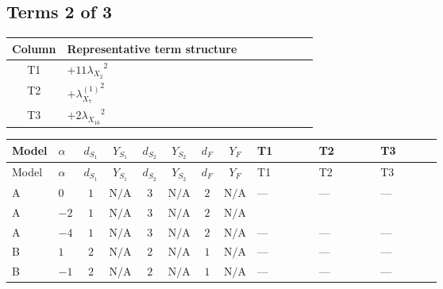 \documentclass[8pt]{article}
\begin{document}
\begin{landscape}
\subsection*{Terms 2 of 3}
\begin{center}
\begin{tabular}{@{}c >{\raggedright\arraybackslash}p{0.82\linewidth}@{}}
\toprule
Column & Representative term structure \\
\midrule
T1 & \(\displaystyle +11 {\lambda_{X_{2}}}^2\) \\
\midrule
T2 & \(\displaystyle +{\lambda_{X_{7}}^{(1)}}^2\) \\
\midrule
T3 & \(\displaystyle +2 {\lambda_{X_{16}}}^2\) \\
\midrule
\bottomrule
\end{tabular}
\end{center}
\smallskip
\tiny
\begin{longtable}{@{}llcccccc >{\raggedright\arraybackslash}p{0.21\linewidth} >{\raggedright\arraybackslash}p{0.21\linewidth} >{\raggedright\arraybackslash}p{0.21\linewidth}@{}}
\toprule
Model & $\alpha$ & $d_{S_1}$ & $Y_{S_1}$ & $d_{S_2}$ & $Y_{S_2}$ & $d_F$ & $Y_F$ & T1 & T2 & T3 \\
\midrule
\endfirsthead
\toprule
Model & $\alpha$ & $d_{S_1}$ & $Y_{S_1}$ & $d_{S_2}$ & $Y_{S_2}$ & $d_F$ & $Y_F$ & T1 & T2 & T3 \\
\midrule
\endhead
A & $0$ & $1$ & $\text{N/A}$ & $3$ & $\text{N/A}$ & $2$ & $\text{N/A}$ & --- & --- & --- \\
\midrule
A & $-2$ & $1$ & $\text{N/A}$ & $3$ & $\text{N/A}$ & $2$ & $\text{N/A}$ & \scriptsize\adjustbox{max width=\linewidth}{$\begin{gathered} +11 {\lambda_{X_{2}}}^2\end{gathered}$} & \scriptsize\adjustbox{max width=\linewidth}{$\begin{gathered} +{\lambda_{X_{7}}^{(1)}}^2\end{gathered}$} & \scriptsize\adjustbox{max width=\linewidth}{$\begin{gathered} +2 {\lambda_{X_{16}}}^2\end{gathered}$} \\
\midrule
A & $-4$ & $1$ & $\text{N/A}$ & $3$ & $\text{N/A}$ & $2$ & $\text{N/A}$ & --- & --- & --- \\
\midrule
B & $1$ & $2$ & $\text{N/A}$ & $2$ & $\text{N/A}$ & $1$ & $\text{N/A}$ & --- & --- & --- \\
\midrule
B & $-1$ & $2$ & $\text{N/A}$ & $2$ & $\text{N/A}$ & $1$ & $\text{N/A}$ & --- & --- & --- \\

\end{longtable}
\end{landscape}
\end{document}
